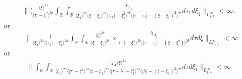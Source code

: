 \documentclass[12pt,reqno]{amsart}
\numberwithin{equation}{section}  %
\numberwithin{figure}{section}
\newcommand{\rr}{\mathbb{R}}
\theoremstyle{plain}
\theoremstyle{definition}
\theoremstyle{remark}
\begin{document}
%
%
%
%
\begin{equation}
  \label{key-sup-estimate-real}
  \begin{split}
     \| \langle  \frac{\langle \xi
     \rangle ^{2s}}{ | \tau | - \xi^{2} \rangle ^{2a}}\int_{\rr} \int_{\rr} \frac{\chi_{A_{j}}}{ \langle \xi_{1} \rangle ^{2s} \langle
\xi-\xi_{1} \rangle ^{2s}
\langle | \tau_{1}|-\xi_{1}^{2} \rangle^{2b}  \langle  |\tau -
    \tau_{1} | -(\xi - \xi_{1})^{2}
    \rangle ^{2b} } d \tau_1 d \xi_{1} \|_{L^\infty_{\xi, \tau}} < \infty.
  \end{split}
\end{equation}
%
or
\begin{equation}
\begin{split}
  & \| \frac{1}{\langle \xi_{1} \rangle ^{2s}
  \langle | \tau_{1} | - \xi_{1}^{2} \rangle
  ^{2a}} \int_{\rr} \int_{\rr} \frac{\langle \xi \rangle ^{2s}}{\langle
  \xi - \xi_{1}\rangle ^{2s}}  \times \frac{\chi_{A_{j}}}{\langle | \tau | - \xi^{2} \rangle ^{2b} \langle | \tau -
  \tau_{1} | - (\xi - \xi_{1}^{2}) \rangle ^{2b}} d \tau d \xi
  \|_{L^{\infty}_{\xi_{1}, \tau_{1}}} < \infty
\end{split}
\end{equation}
or
\begin{equation}
\begin{split}
  \| \int_{\rr} \int_{\rr} \frac{\chi_{A}
    \langle \xi \rangle ^{2s}
    }{ \langle \xi_{1} \rangle^{2s} \langle | \tau | - \xi^{2}
    \rangle ^{2a}  \langle
\xi-\xi_{1} \rangle ^{2s}  \langle | \tau - \lambda|-\xi_{1}^{2}
\rangle^{2b} \langle  | \lambda | -(\xi - \xi_{1})^{2}
\rangle^{2b} } d \tau d \xi_{1} \|_{L^{\infty}_{\xi, \lambda}} < \infty
\end{split}
\end{equation}
\end{document}
